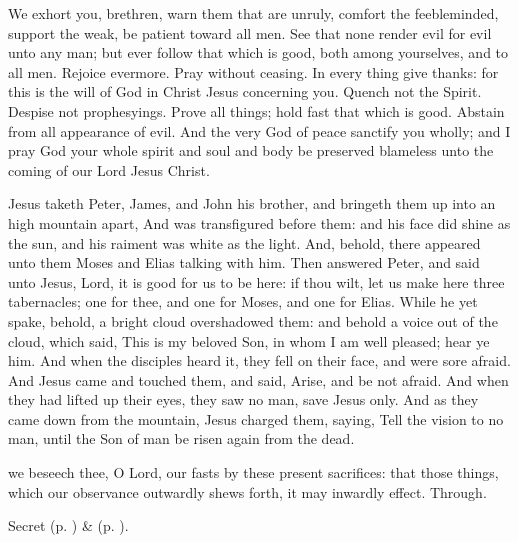  We exhort you, brethren, warn them that are unruly, comfort the feebleminded, support the weak, be patient toward all men. See that none render evil for evil unto any man; but ever follow that which is good, both among yourselves, and to all men. Rejoice evermore. Pray without ceasing. In every thing give thanks: for this is the will of God in Christ Jesus concerning you. Quench not the Spirit. Despise not prophesyings. Prove all things; hold fast that which is good. Abstain from all appearance of evil. And the very God of peace sanctify you wholly; and I pray God your whole spirit and soul and body be preserved blameless unto the coming of our Lord Jesus Christ.


 Jesus taketh Peter, James, and John his brother, and bringeth them up into an high mountain apart, And was transfigured before them: and his face did shine as the sun, and his raiment was white as the light. And, behold, there appeared unto them Moses and Elias talking with him. Then answered Peter, and said unto Jesus, Lord, it is good for us to be here: if thou wilt, let us make here three tabernacles; one for thee, and one for Moses, and one for Elias. While he yet spake, behold, a bright cloud overshadowed them: and behold a voice out of the cloud, which said, This is my beloved Son, in whom I am well pleased; hear ye him. And when the disciples heard it, they fell on their face, and were sore afraid. And Jesus came and touched them, and said, Arise, and be not afraid. And when they had lifted up their eyes, they saw no man, save Jesus only. And as they came down from the mountain, Jesus charged them, saying, Tell the vision to no man, until the Son of man be risen again from the dead.


\secret
{} we beseech thee, O Lord, our fasts by these present sacrifices: that those things, which our observance outwardly shews forth, it may inwardly effect. Through.

\begin{rubric}
     Secret  (p. \pageref{AshWednesdayMassSecret}) \&   (p. \pageref{SPLivingDeparted}).
\end{rubric}

